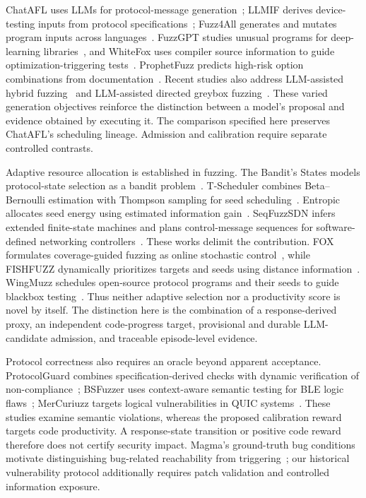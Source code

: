 \documentclass[final,5p,times,number]{elsarticle}
\begin{document}
ChatAFL uses LLMs for protocol-message generation~\cite{chatafl}; LLMIF derives device-testing inputs from protocol specifications~\cite{llmif_augmented_large_language_2024}; Fuzz4All generates and mutates program inputs across languages~\cite{fuzz4all_universal_fuzzing_large_2024}. FuzzGPT studies unusual programs for deep-learning libraries~\cite{fuzzgpt2024}, and WhiteFox uses compiler source information to guide optimization-triggering tests~\cite{whitefox2024}. ProphetFuzz predicts high-risk option combinations from documentation~\cite{prophetfuzz2024}. Recent studies also address LLM-assisted hybrid fuzzing~\cite{hybridllm2026} and LLM-assisted directed greybox fuzzing~\cite{hgfuzzer2026}. These varied generation objectives reinforce the distinction between a model's proposal and evidence obtained by executing it. The comparison specified here preserves ChatAFL's scheduling lineage. Admission and calibration require separate controlled contrasts.

Adaptive resource allocation is established in fuzzing. The Bandit's States models protocol-state selection as a bandit problem~\cite{bandits_states2023}. T-Scheduler combines Beta--Bernoulli estimation with Thompson sampling for seed scheduling~\cite{tscheduler2024}. Entropic allocates seed energy using estimated information gain~\cite{entropic2020}. SeqFuzzSDN infers extended finite-state machines and plans control-message sequences for software-defined networking controllers~\cite{seqfuzzsdn2026}. These works delimit the contribution. FOX formulates coverage-guided fuzzing as online stochastic control~\cite{fox2024}, while FISHFUZZ dynamically prioritizes targets and seeds using distance information~\cite{fishfuzz2023}. WingMuzz schedules open-source protocol programs and their seeds to guide blackbox testing~\cite{wingmuzz2025}. Thus neither adaptive selection nor a productivity score is novel by itself. The distinction here is the combination of a response-derived proxy, an independent code-progress target, provisional and durable LLM-candidate admission, and traceable episode-level evidence.

Protocol correctness also requires an oracle beyond apparent acceptance. ProtocolGuard combines specification-derived checks with dynamic verification of non-compliance~\cite{protocolguard2026}; BSFuzzer uses context-aware semantic testing for BLE logic flaws~\cite{bsfuzzer2026}; MerCuriuzz targets logical vulnerabilities in QUIC systems~\cite{mercuriuzz2026}. These studies examine semantic violations, whereas the proposed calibration reward targets code productivity. A response-state transition or positive code reward therefore does not certify security impact. Magma's ground-truth bug conditions motivate distinguishing bug-related reachability from triggering~\cite{magma2020}; our historical vulnerability protocol additionally requires patch validation and controlled information exposure.
\end{document}
